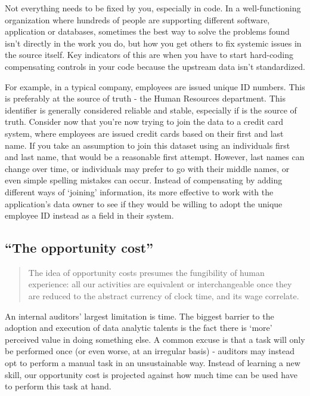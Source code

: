 \documentclass[
]{book}
\begin{document}
Not everything needs to be fixed by you, especially in code. In a well-functioning organization where hundreds of people are supporting different software, application or databases, sometimes the best way to solve the problems found isn't directly in the work you do, but how you get others to fix systemic issues in the source itself. Key indicators of this are when you have to start hard-coding compensating controls in your code because the upstream data isn't standardized.

For example, in a typical company, employees are issued unique ID numbers. This is preferably at the source of truth - the Human Resources department. This identifier is generally considered reliable and stable, especially if is the source of truth. Consider now that you're now trying to join the data to a credit card system, where employees are issued credit cards based on their first and last name. If you take an assumption to join this dataset using an individuals first and last name, that would be a reasonable first attempt. However, last names can change over time, or individuals may prefer to go with their middle names, or even simple spelling mistakes can occur. Instead of compensating by adding different ways of `joining' information, its more effective to work with the application's data owner to see if they would be willing to adopt the unique employee ID instead as a field in their system.

\hypertarget{the-opportunity-cost}{%
\subsection{``The opportunity cost''}\label{the-opportunity-cost}}

\begin{quote}
The idea of opportunity costs presumes the fungibility of human experience: all our activities are equivalent or interchangeable once they are reduced to the abstract currency of clock time, and its wage correlate. \citep{shop-class}
\end{quote}

An internal auditors' largest limitation is time. The biggest barrier to the adoption and execution of data analytic talents is the fact there is `more' perceived value in doing something else. A common excuse is that a task will only be performed once (or even worse, at an irregular basis) - auditors may instead opt to perform a manual task in an unsustainable way. Instead of learning a new skill, our opportunity cost is projected against how much time can be used have to perform this task at hand.
\end{document}
